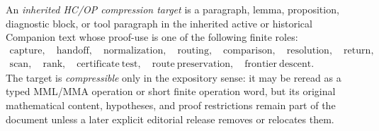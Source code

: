 \begin{definition}
\label{def:inherited-hcop-compression-target}
An \emph{inherited HC/OP compression target} is a paragraph, lemma, proposition, diagnostic block, or tool paragraph in the inherited active or historical Companion text whose proof-use is one of the following finite roles:
\[
\begin{gathered}
 \mathrm{capture},\quad
 \mathrm{handoff},\quad
 \mathrm{normalization},\quad
 \mathrm{routing},\quad
 \mathrm{comparison},\quad
 \mathrm{resolution},\quad
 \mathrm{return},\\
 \mathrm{scan},\quad
 \mathrm{rank},\quad
 \mathrm{certificate\ test},\quad
 \mathrm{route\ preservation},\quad
 \mathrm{frontier\ descent}.
\end{gathered}
\]
The target is \emph{compressible} only in the expository sense: it may be reread as a typed MML/MMA operation or short finite operation word, but its original mathematical content, hypotheses, and proof restrictions remain part of the document unless a later explicit editorial release removes or relocates them.
\end{definition}

